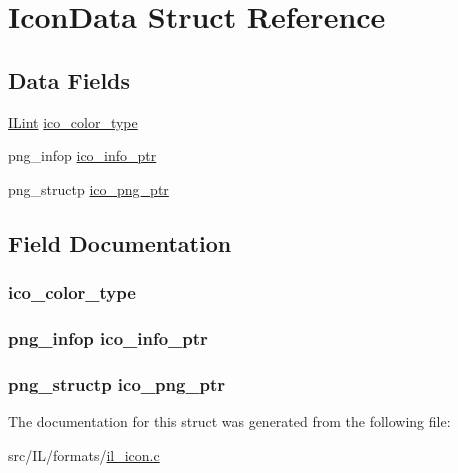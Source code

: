\hypertarget{struct_icon_data}{\section{Icon\-Data Struct Reference}
\label{struct_icon_data}
}
\subsection*{Data Fields}
\begin{DoxyCompactItemize}
\item 
\hyperlink{il_8h_a288a97fb9e92e707a60b749d0039fafe}{I\-Lint} \hyperlink{struct_icon_data_ab5cf9e19bf061d1f6ec83caf2d792765}{ico\-\_\-color\-\_\-type}
\item 
png\-\_\-infop \hyperlink{struct_icon_data_a4f1acbcb30d45c76c6dfd3a69fc330a2}{ico\-\_\-info\-\_\-ptr}
\item 
png\-\_\-structp \hyperlink{struct_icon_data_a0d4111649261906d2e4cfd3a5b61146d}{ico\-\_\-png\-\_\-ptr}
\end{DoxyCompactItemize}


\subsection{Field Documentation}
\hypertarget{struct_icon_data_ab5cf9e19bf061d1f6ec83caf2d792765}{
\subsubsection[{ico\-\_\-color\-\_\-type}]{ ico\-\_\-color\-\_\-type}}\label{struct_icon_data_ab5cf9e19bf061d1f6ec83caf2d792765}
\hypertarget{struct_icon_data_a4f1acbcb30d45c76c6dfd3a69fc330a2}{
\subsubsection[{ico\-\_\-info\-\_\-ptr}]{\setlength{\rightskip}{0pt plus 5cm}png\-\_\-infop ico\-\_\-info\-\_\-ptr}}\label{struct_icon_data_a4f1acbcb30d45c76c6dfd3a69fc330a2}
\hypertarget{struct_icon_data_a0d4111649261906d2e4cfd3a5b61146d}{
\subsubsection[{ico\-\_\-png\-\_\-ptr}]{\setlength{\rightskip}{0pt plus 5cm}png\-\_\-structp ico\-\_\-png\-\_\-ptr}}\label{struct_icon_data_a0d4111649261906d2e4cfd3a5b61146d}


The documentation for this struct was generated from the following file\-:\begin{DoxyCompactItemize}
\item 
src/\-I\-L/formats/\hyperlink{il__icon_8c}{il\-\_\-icon.\-c}\end{DoxyCompactItemize}
